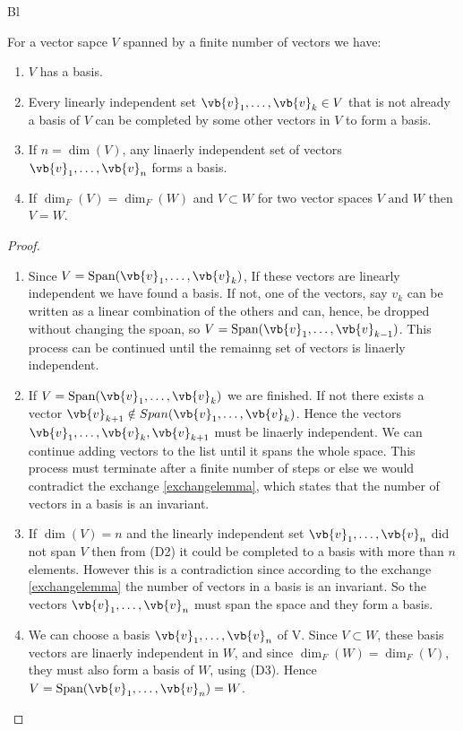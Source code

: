 \documentclass[a4paper,12pt]{report}
\begin{document}
Bl
\begin{lemma}
For a vector sapce \(V\) spanned by a finite number of vectors we have:

\begin{enumerate}[label=(\(D\)\arabic*)] 
    \item \(V \) has a basis.
    \item Every linearly independent set \(\vb{v}_{1}, \ldots, \vb{v}_k \in V\) that is not already a basis of \(V\) can be completed by some other vectors in \(V\) to form a basis.
    \item If \(n = \dim (V)\), any linaerly independent set of vectors \(\vb{v}_{1}, \ldots, \vb{v}_n \) forms a basis.
    \item If \(\dim _{F} (V) = \dim _{F} (W)\) and \(V \subset W\) for two vector spaces \(V \text { and } W\) then \(V=W\).      
\end{enumerate}

\end{lemma}

\begin{proof}

\begin{enumerate}[label=(\(D\)\arabic*)] 
    \item Since \(V = \text{Span}(\vb{v}_{1}, \ldots, \vb{v}_k ) \), If these vectors are linearly independent we have found a basis. If not, one of the vectors, say \(v_{k} \) can be written as a linear combination of the others and can, hence, be dropped without changing the spoan, so \(V = \text{Span}(\vb{v}_{1}, \ldots, \vb{v}_{k-1}) \). This process can be continued until the remainng set of vectors is linaerly independent.
    \item If \(V= \text{Span}(\vb{v}_{1}, \ldots, \vb{v}_k) \) we are finished. If not there exists a vector \(\vb{v} _{k+1} \notin Span(\vb{v}_{1}, \ldots, \vb{v}_k) \). Hence the vectors \(\vb{v}_{1}, \ldots, \vb{v}_k, \vb{v} _{k+1} \) must be linaerly independent. We can continue adding vectors to the list until it spans the whole space. This process must terminate after a finite number of steps or else we would contradict the exchange \cref{exchangelemma}, which states that the number of vectors in a basis is an invariant.
    \item If \(\dim (V) = n\) and the linearly independent set \(\vb{v}_{1}, \ldots, \vb{v}_n \) did not span \(V\) then from (D2) it could be completed to a basis with more than \(n\) elements. However this is a contradiction since according to the exchange \cref{exchangelemma} the number of vectors in a basis is an invariant. So the vectors \(\vb{v}_{1}, \ldots, \vb{v}_n \) must span the space and they form a basis.
    \item We can choose a basis \(\vb{v}_{1}, \ldots, \vb{v}_n \) of V. Since \(V \subset W\), these basis vectors are linaerly independent in \(W\), and since \(\dim _{F} (W) = \dim _{F} (V)  \), they must also form a basis of \(W\), using (D3). Hence \(V = \text{Span}(\vb{v}_{1}, \ldots, \vb{v}_n ) = W \).         
\end{enumerate}

\end{proof}
\end{document}
